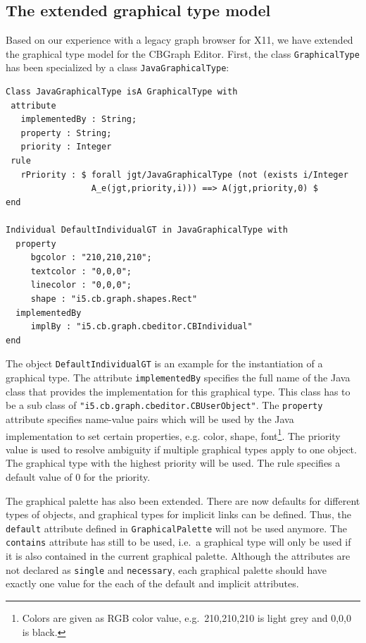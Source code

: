 \subsection{The extended graphical type model}

Based on our experience with a legacy graph browser for X11, we have
extended the graphical type model for the CBGraph Editor. First,
the class {\tt Graphical\-Type} has been specialized by a class {\tt Java\-Graphical\-Type}:

{\small
\begin{verbatim}
Class JavaGraphicalType isA GraphicalType with
 attribute
   implementedBy : String;
   property : String;
   priority : Integer
 rule
   rPriority : $ forall jgt/JavaGraphicalType (not (exists i/Integer
                 A_e(jgt,priority,i))) ==> A(jgt,priority,0) $
end

Individual DefaultIndividualGT in JavaGraphicalType with
  property
     bgcolor : "210,210,210";
     textcolor : "0,0,0";
     linecolor : "0,0,0";
     shape : "i5.cb.graph.shapes.Rect"
  implementedBy
     implBy : "i5.cb.graph.cbeditor.CBIndividual"
end
\end{verbatim}
}

The object {\tt DefaultIndividualGT} is an example for the instantiation
of a graphical type.
The attribute {\tt implementedBy} specifies the full name of the Java class
that provides the implementation for this graphical type. This class
has to be a sub class of \verb+"i5.cb.graph.cbeditor.CBUserObject"+.
The {\tt property} attribute specifies name-value pairs which will
be used by the Java implementation to set certain properties, e.g.
color, shape, font\footnote{Colors are given as RGB color value, e.g.\ 210,210,210
is light grey and 0,0,0 is black.}.
The priority value is used to resolve ambiguity
if multiple graphical types apply to one object. The graphical type
with the highest priority will be used. The rule specifies a default
value of 0 for the priority.

The graphical palette has also been extended. There are now defaults
for different types of objects, and graphical types for implicit
links can be defined. Thus, the {\tt default} attribute defined
in {\tt Graphical\-Palette} will not be used anymore. The {\tt contains}
attribute has still to be used, i.e.\ a graphical type
will only be used if it is also contained in the current
graphical palette. Although the attributes are not declared as
{\tt single} and {\tt necessary}, each graphical palette should
have exactly one value for the each of the default and implicit attributes.


